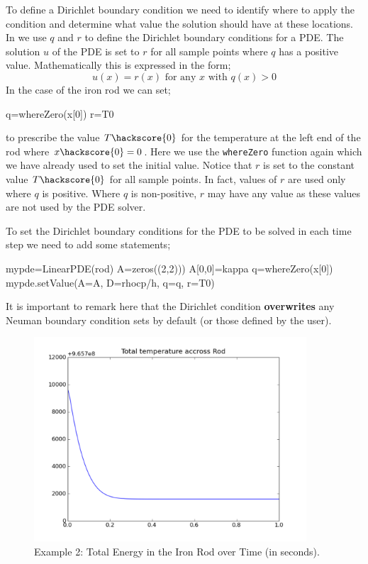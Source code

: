To define a Dirichlet boundary condition we need to identify where to apply the condition and determine what value the 
solution should have at these locations. In \esc we use $q$ and $r$ to define the Dirichlet boundary conditions
for a PDE. The solution $u$ of the PDE is set to $r$ for all sample points where $q$ has a positive value.
Mathematically this is expressed in the form;
\begin{equation}
  u(x) = r(x) \mbox{ for any } x \mbox{ with } q(x) > 0
\end{equation} 
In the case of the iron rod 
we can set;
\begin{python}
q=whereZero(x[0])
r=T0
\end{python}
to prescribe the value $T\hackscore{0}$ for the temperature at the left end of the rod where $x\hackscore{0}=0$. 
Here we use the \verb|whereZero| function again which we have already used to set the initial value.
Notice that $r$ is set to the constant value $T\hackscore{0}$ for all sample points. In fact, 
values of $r$ are used only where $q$ is positive. Where $q$ is non-positive,
$r$ may have any value as these values are not used by the PDE solver. 

To set the Dirichlet boundary conditions for the PDE to be solved in each time step we need
to add some statements;
\begin{python}
mypde=LinearPDE(rod)
A=zeros((2,2)))
A[0,0]=kappa
q=whereZero(x[0])
mypde.setValue(A=A, D=rhocp/h, q=q, r=T0)
\end{python}
It is important to remark here that the Dirichlet condition \textbf{overwrites} any Neuman boundary 
condition \esc sets by default (or those defined by the user).  

\begin{figure}
\begin{center}
\includegraphics[width=4in]{figures/ttrodpyplot150}
\caption{Example 2: Total Energy in the Iron Rod over Time (in seconds).}
\label{fig:onedheatout1 002} 
\end{center}
\end{figure}


